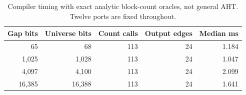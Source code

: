 \begin{table}[htbp]\centering\small
\begin{tabular}{@{}rrrrr@{}}\toprule
Gap bits & Universe bits & Count calls & Output edges & Median ms \\\midrule
65 & 68 & 113 & 24 & 1.184 \\
1,025 & 1,028 & 113 & 24 & 1.047 \\
4,097 & 4,100 & 113 & 24 & 2.099 \\
16,385 & 16,388 & 113 & 24 & 1.641 \\
\bottomrule\end{tabular}
\caption{Compiler timing with exact analytic block-count oracles, not general AHT. Twelve ports are fixed throughout.}
\label{tab:binary}\end{table}
